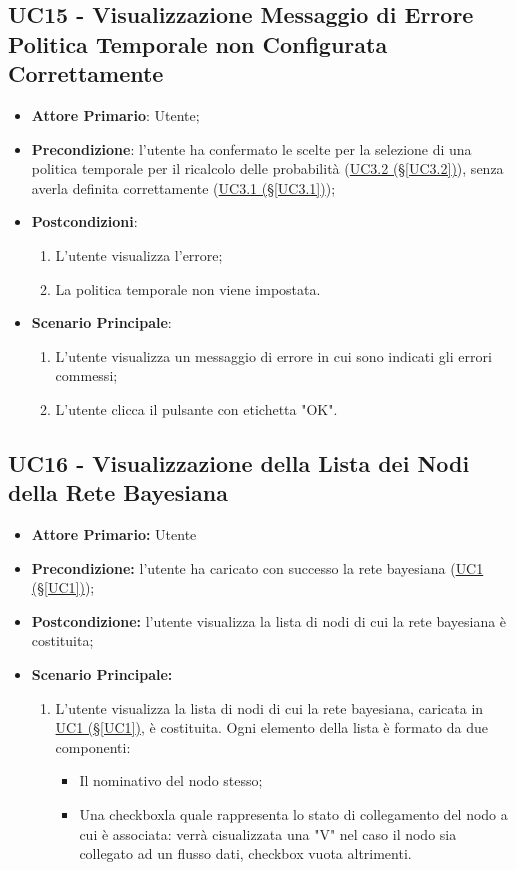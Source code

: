 \pagebreak

\subsection{UC15 - Visualizzazione Messaggio di Errore Politica Temporale non Configurata Correttamente}\label{UC15}
\begin{itemize}
	\item \textbf{Attore Primario}: Utente;
	\item \textbf{Precondizione}: l'utente ha confermato le scelte per la selezione di una politica temporale per il ricalcolo delle probabilità (\hyperref[UC3.2]{UC3.2 (§\ref*{UC3.2})}), senza averla definita correttamente (\hyperref[UC3.1]{UC3.1 (§\ref*{UC3.1})});
	\item \textbf{Postcondizioni}: 
	\begin{enumerate}
		\item L'utente visualizza l'errore;
		\item La politica temporale non viene impostata.
	\end{enumerate}
	\item \textbf{Scenario Principale}: 
	\begin{enumerate}
		\item L'utente visualizza un messaggio di errore in cui sono indicati gli errori commessi;
		\item L'utente clicca il pulsante con etichetta "OK".
	\end{enumerate}
\end{itemize}

\pagebreak

\subsection{UC16 - Visualizzazione della Lista dei Nodi della Rete Bayesiana}\label{UC16}
\begin{itemize}
	\item \textbf{Attore Primario:}  Utente
	\item \textbf{Precondizione:} l'utente ha caricato con successo la rete bayesiana (\hyperref[UC1]{UC1 	(§\ref*{UC1})});
	\item \textbf{Postcondizione:} l'utente visualizza la lista di nodi di cui la rete bayesiana è costituita;
	\item \textbf{Scenario Principale:}
	\begin{enumerate}
		\item L'utente visualizza la lista di nodi di cui la rete bayesiana, caricata in \hyperref[UC1]{UC1 									(§\ref*{UC1})}, è costituita. Ogni elemento della lista è formato da due componenti:
		\begin{itemize}
			\item Il nominativo del nodo stesso;
			\item Una checkbox\glossario la quale rappresenta lo stato di collegamento del nodo a cui è associata: verrà cisualizzata una "V" nel caso il nodo sia collegato ad un flusso dati, checkbox vuota altrimenti.
		\end{itemize}
	\end{enumerate}
\end{itemize}

